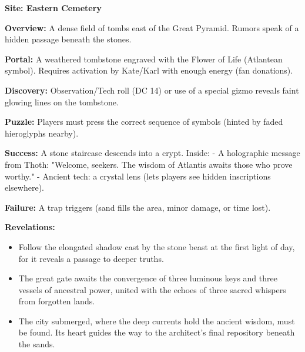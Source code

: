 \documentclass[12pt]{article}
\begin{document}
\textbf{Site: Eastern Cemetery}

\textbf{Overview:}  
A dense field of tombs east of the Great Pyramid. Rumors speak of a hidden passage beneath the stones.

\textbf{Portal:}  
A weathered tombstone engraved with the Flower of Life (Atlantean symbol). Requires activation by Kate/Karl with enough energy (fan donations).

\textbf{Discovery:}  
Observation/Tech roll (DC 14) or use of a special gizmo reveals faint glowing lines on the tombstone.

\textbf{Puzzle:}  
Players must press the correct sequence of symbols (hinted by faded hieroglyphs nearby).

\textbf{Success:}  
A stone staircase descends into a crypt. Inside:  
- A holographic message from Thoth: "Welcome, seekers. The wisdom of Atlantis awaits those who prove worthy."  
- Ancient tech: a crystal lens (lets players see hidden inscriptions elsewhere).

\textbf{Failure:}  
A trap triggers (sand fills the area, minor damage, or time lost).

\textbf{Revelations:}
\begin{itemize}
  \item Follow the elongated shadow cast by the stone beast at the first light of day, for it reveals a passage to deeper truths.
  \item The great gate awaits the convergence of three luminous keys and three vessels of ancestral power, united with the echoes of three sacred whispers from forgotten lands.
  \item The city submerged, where the deep currents hold the ancient wisdom, must be found. Its heart guides the way to the architect's final repository beneath the sands.
\end{itemize}
\end{document}
